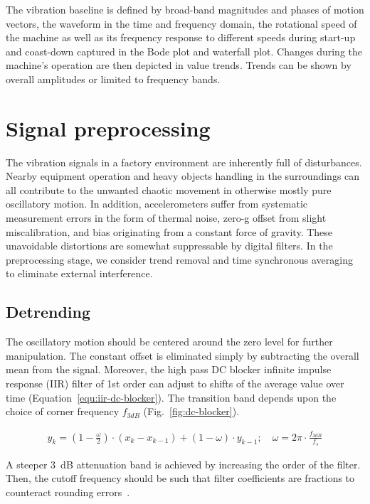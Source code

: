 The vibration baseline is defined by broad-band magnitudes and phases of motion vectors, the waveform in the time and frequency domain, the rotational speed of the machine as well as its frequency response to different speeds during start-up and coast-down captured in the Bode plot and waterfall plot. Changes during the machine's operation are then depicted in value trends. Trends can be shown by overall amplitudes or limited to frequency bands.

\section{Signal preprocessing} \label{section:signal-preprocessing}
The vibration signals in a factory environment are inherently full of disturbances. Nearby equipment operation and heavy objects handling in the surroundings can all contribute to the unwanted chaotic movement in otherwise mostly pure oscillatory motion. In addition, accelerometers suffer from systematic measurement errors in the form of thermal noise, zero-g offset from slight miscalibration, and bias originating from a constant force of gravity. These unavoidable distortions are somewhat suppressable by digital filters. In the preprocessing stage, we consider trend removal and time synchronous averaging to eliminate external interference.

\subsection{Detrending}
The oscillatory motion should be centered around the zero level for further manipulation. The constant offset is eliminated simply by subtracting the overall mean from the signal. Moreover, the high pass DC blocker infinite impulse response (IIR) filter of 1st order can adjust to shifts of the average value over time (Equation~\ref{equ:iir-dc-blocker}). The transition band depends upon the choice of corner frequency $f_{3dB}$ (Fig.~\ref{fig:dc-blocker}).

\begin{ceqn}\begin{align} \label{equ:iir-dc-blocker}
y_k = (1 - \frac{\omega}{2}) \cdot (x_k  -  x_{k - 1}) + (1 - \omega) \cdot y_{k - 1}; \quad \omega = 2\pi \cdot \frac{f_{3dB}}{f_s}
\end{align}\end{ceqn}

A steeper 3~dB attenuation band is achieved by increasing the order of the filter. Then, the cutoff frequency should be such that filter coefficients are fractions to counteract rounding errors~\cite{tittelbach-helmrich_digital_2021}.

